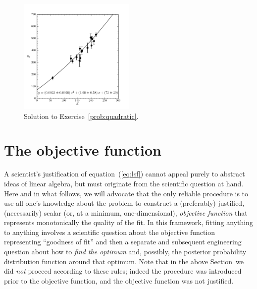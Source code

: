 \documentclass[12pt,twoside]{article}
\newcommand{\sectionname}{Section}
\newcommand{\equationname}{equation}
\newcommand{\problemname}{Exercise}
\newcounter{problem}
\begin{document}
\begin{figure}[htb]
\includegraphics[width=0.5\textwidth]{ex3.png}
\caption{Solution to \problemname~\ref{prob:quadratic}.}\label{fig:quadratic}
\end{figure}

\section{The objective function}\label{sec:objective}

A scientist's justification of \equationname~(\ref{eq:lsf}) cannot
appeal purely to abstract ideas of linear algebra, but must originate
from the scientific question at hand.  Here and in what follows, we
will advocate that the only reliable procedure is to use all one's
knowledge about the problem to construct a (preferably) justified,
(necessarily) scalar (or, at a minimum, one-dimensional), \emph{objective
  function} that represents monotonically the quality of the fit.  In
this framework, fitting anything to anything involves a scientific
question about the objective function representing ``goodness of fit''
and then a separate and subsequent engineering question about how to
\emph{find the optimum} and, possibly, the posterior probability
distribution function around that optimum.  Note that in the above
\sectionname\ we did \emph{not} proceed according to these rules;
indeed the procedure was introduced prior to the objective function,
and the objective function was not justified.
\end{document}
